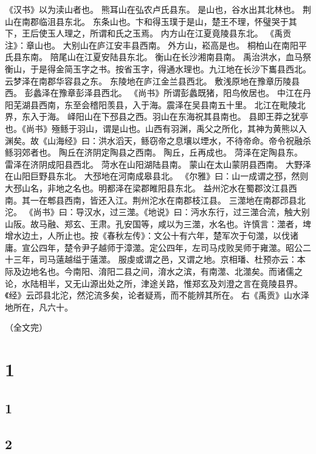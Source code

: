 \documentclass[12pt,UTF8]{ctexbook}
\begin{document}
《汉书》以为渎山者也。
熊耳山在弘农卢氏县东。
是山也，谷水出其北林也。
荆山在南郡临沮县东北。
东条山也。卞和得玉璞于是山，楚王不理，怀璧哭于其下，王后使玉人理之，所谓和氏之玉焉。
内方山在江夏竟陵县东北。
《禹贡注》：章山也。
大别山在庐江安丰县西南。
外方山，崧高是也。
桐柏山在南阳平氏县东南。
陪尾山在江夏安陆县东北。
衡山在长沙湘南县南。
禹治洪水，血马祭衡山，于是得金简玉字之书。按省玉字，得通水理也。九江地在长沙下巂县西北。
云梦泽在南郡华容县之东。
东陵地在庐江金兰县西北。
敷浅原地在豫章历陵县西。
彭蠡泽在豫章彭泽县西北。
《尚书》所谓彭蠡既猪，阳鸟攸居也。
中江在丹阳芜湖县西南，东至会稽阳羡县，入于海。震泽在吴县南五十里。
北江在毗陵北界，东入于海。
峄阳山在下邳县之西。羽山在东海祝其县南也。
县即王莽之犹亭也。《尚书》殛鲧于羽山，谓是山也。山西有羽渊，禹父之所化，其神为黄熊以入渊矣。故《山海经》曰：洪水滔天，鲧窃帝之息壤以堙水，不待帝命。帝令祝融杀鲧羽郊者也。
陶丘在济阴定陶县之西南。
陶丘，丘再成也。
菏泽在定陶县东。
雷泽在济阴成阳县西北。
菏水在山阳湖陆县南。
蒙山在太山蒙阴县西南。
大野泽在山阳巨野县东北。
大邳地在河南成皋县北。
《尔雅》曰：山一成谓之邳，然则大邳山名，非地之名也。明都泽在梁郡睢阳县东北。
益州沱水在蜀郡汶江县西南。其一在郫县西南，皆还入江。荆州沱水在南郡枝江县。
三澨地在南郡邔县北沱。
《尚书》曰：导汉水，过三澨。《地说》曰：沔水东行，过三澨合流，触大别山阪。故马融、郑玄、王肃。孔安国等，咸以为三澨，水名也。许慎言：澨者，埤增水边土，人所止也。按《春秋左传》：文公十有六年，楚军次于句澨，以伐诸庸。宣公四年，楚令尹子越师于漳澨。定公四年，左司马戍败吴师于雍澨。昭公二十三年，司马薳越缢于薳澨。
服虔或谓之邑，又谓之地。京相璠、杜预亦云：本际及边地名也。今南阳、淯阳二县之间，淯水之滨，有南澨、北澨矣。而诸儒之论，水陆相半，又无山源出处之所，津途关路，惟郑玄及刘澄之言在竟陵县界。《经》云邔县北沱，然沱流多矣，论者疑焉，而不能辨其所在。
右《禹贡》山水泽地所在，凡六十。

（全文完）
\chapter{1}
\section{1}
\section{2}

\backmatter
\end{document}
